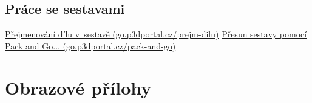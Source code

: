 \section{Práce se sestavami} \label{videa-sestavy}
\href{https://go.p3dportal.cz/prejm-dilu}{Přejmenování dílu v~sestavě (go.p3dportal.cz/prejm-dilu)} \newline
\href{https://go.p3dportal.cz/pack-and-go}{Přesun sestavy pomocí Pack and Go... (go.p3dportal.cz/pack-and-go)} \newline


\chapter{Obrazové přílohy}



\newpage